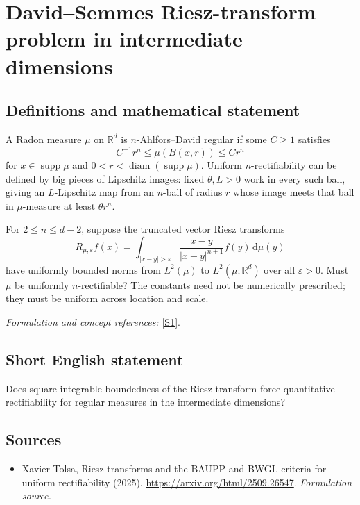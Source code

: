 \documentclass[11pt]{article}
\begin{document}
\section*{\texorpdfstring{David–Semmes Riesz-transform problem in intermediate dimensions}{David–Semmes Riesz-transform problem in intermediate dimensions}}\label{470}
\subsection{Definitions and mathematical statement}
A Radon measure $\mu$ on ${\mathbb{R}}^d$ is $n$-Ahlfors--David regular if some $C\ge1$ satisfies
\[
 C^{-1}r^n\le\mu(B(x,r))\le Cr^n
\]
for $x\in\operatorname{supp}\mu$ and $0<r<\operatorname{diam}(\operatorname{supp}\mu)$. Uniform $n$-rectifiability can be defined by big pieces of Lipschitz images: fixed $\theta,L>0$ work in every such ball, giving an $L$-Lipschitz map from an $n$-ball of radius $r$ whose image meets that ball in $\mu$-measure at least $\theta r^n$.

For $2\le n\le d-2$, suppose the truncated vector Riesz transforms
\[
 R_{\mu,{\varepsilon}}f(x)=\int_{|x-y|>{\varepsilon}}
 \frac{x-y}{|x-y|^{n+1}}f(y){\,\mathrm{d}}\mu(y)
\]
have uniformly bounded norms from $L^2(\mu)$ to $L^2(\mu;{\mathbb{R}}^d)$ over all ${\varepsilon}>0$. Must $\mu$ be uniformly $n$-rectifiable? The constants need not be numerically prescribed; they must be uniform across location and scale.
\par\smallskip\textit{Formulation and concept references:} \href{https://arxiv.org/html/2509.26547}{[S1]}.

\subsection{Short English statement}
Does square-integrable boundedness of the Riesz transform force quantitative rectifiability for regular measures in the intermediate dimensions?
\subsection{Sources}
\begin{itemize}
\item[S1]Xavier Tolsa, Riesz transforms and the BAUPP and BWGL criteria for uniform rectifiability (2025).
\url{https://arxiv.org/html/2509.26547}.
\textit{Formulation source.}
\end{itemize}
\end{document}
